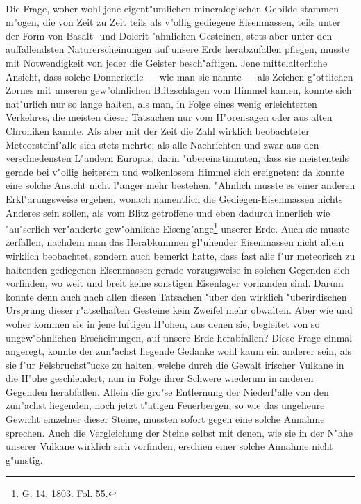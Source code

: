 \documentclass[a4paper, 8pt, oneside, polutonikogreek, german]{article}
\begin{document}
\paragraph{}
Die Frage, woher wohl jene eigent"umlichen mineralogischen Gebilde stammen m"ogen, die von Zeit zu Zeit teils als v"ollig gediegene Eisenmassen, teils unter der Form von Basalt- und Dolerit-"ahnlichen Gesteinen, stets aber unter den auffallendsten Naturerscheinungen auf unsere Erde herabzufallen pflegen, musste mit Notwendigkeit von jeder die Geister besch"aftigen. Jene mittelalterliche Ansicht, dass solche Donnerkeile — wie man sie nannte — als Zeichen g"ottlichen Zornes mit unseren gew"ohnlichen Blitzschlagen vom Himmel kamen, konnte sich nat"urlich nur so lange halten, als man, in Folge eines wenig erleichterten Verkehres, die meisten dieser Tatsachen nur vom H"orensagen oder aus alten Chroniken kannte. Als aber mit der Zeit die Zahl wirklich beobachteter Meteorsteinf"alle sich stets mehrte; als alle Nachrichten und zwar aus den verschiedensten L"andern Europas, darin "ubereinstimmten, dass sie meistenteils gerade bei v"ollig heiterem und wolkenlosem Himmel sich ereigneten: da konnte eine solche Ansicht nicht l"anger mehr bestehen. "Ahnlich musste es einer anderen Erkl"arungsweise ergehen, wonach namentlich die Gediegen-Eisenmassen nichts Anderes sein sollen, als vom Blitz getroffene und eben dadurch innerlich wie "au"serlich ver"anderte gew"ohnliche Eiseng"ange\footnote{G. 14. 1803. Fol. 55.} unserer Erde. Auch sie musste zerfallen, nachdem man das Herabkummen gl"uhender Eisenmassen nicht allein wirklich beobachtet, sondern auch bemerkt hatte, dass fast alle f"ur meteorisch zu haltenden gediegenen Eisenmassen gerade vorzugsweise in solchen Gegenden sich vorfinden, wo weit und breit keine sonstigen Eisenlager vorhanden sind. Darum konnte denn auch nach allen diesen Tatsachen "uber den wirklich "uberirdischen Ursprung dieser r"atselhaften Gesteine kein Zweifel mehr obwalten. Aber wie und woher kommen sie in jene luftigen H"ohen, aus denen sie, begleitet von so ungew"ohnlichen Erscheinungen, auf unsere Erde herabfallen? Diese Frage einmal angeregt, konnte der zun"achst liegende Gedanke wohl kaum ein anderer sein, als sie f"ur Felsbruchst"ucke zu halten, welche durch die Gewalt irischer Vulkane in die H"ohe geschlendert, nun in Folge ihrer Schwere wiederum in anderen Gegenden herabfallen. Allein die gro"se Entfernung der Niederf"alle von den zun"achst liegenden, noch jetzt t"atigen Feuerbergen, so wie das ungeheure Gewicht einzelner dieser Steine, mussten sofort gegen eine solche Annahme sprechen. Auch die Vergleichung der Steine selbst mit denen, wie sie in der N"ahe unserer Vulkane wirklich sich vorfinden, erschien einer solche Annahme nicht g"unstig.
\end{document}
